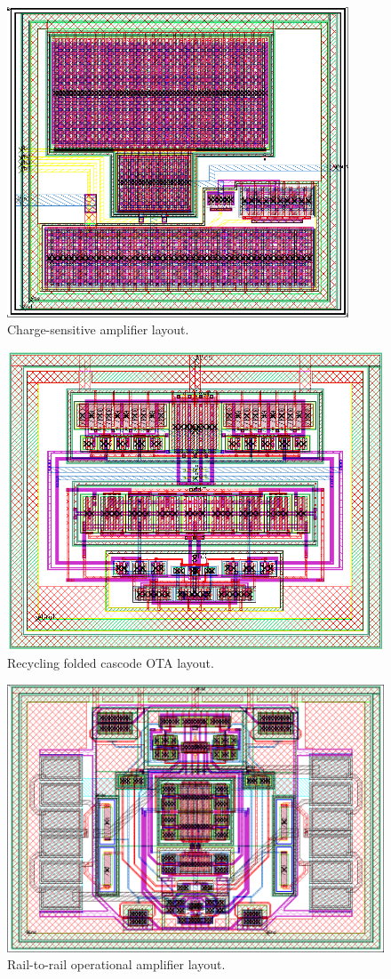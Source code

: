 \begin{figure}[!p]
	\centering
	\includegraphics[width=4in]{./Figures/CSA_layout}
	\caption{Charge-sensitive amplifier layout.}\label{fig:csa_layout}
\end{figure}

\begin{figure}[!t]
	\centering
	\includegraphics[width=4.5in]{./Figures/OTA_layout}
	\caption{Recycling folded cascode OTA layout.}\label{fig:ota_layout}
\end{figure}

\begin{figure}[!t]
	\centering
	\includegraphics[width=4.5in]{./Figures/buffer_layout}
	\caption{Rail-to-rail operational amplifier layout.}\label{fig:buffer_layout}
\end{figure}

